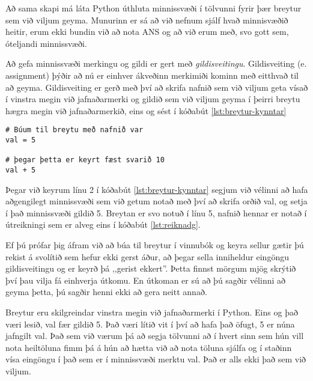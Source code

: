 Að sama skapi má láta Python úthluta minnissvæði í tölvunni fyrir þær breytur sem við viljum geyma.
Munurinn er sá að við nefnum sjálf hvað minnisvæðið heitir, erum ekki bundin við að nota ANS og að við erum með, svo gott sem, óteljandi minnissvæði.

Að gefa minnissvæði merkingu og gildi er gert með \textit{gildisveitingu}.
Gildisveiting (e. assignment) þýðir að nú er einhver ákveðinn merkimiði kominn með eitthvað til að geyma.
Gildisveiting er gerð með því að skrifa nafnið sem við viljum geta vísað í vinstra megin við jafnaðarmerki og gildið sem við viljum geyma í þeirri breytu hægra megin við jafnaðarmerkið, eins og sést í kóðabút \ref{lst:breytur-kynntar}

\begin{lstlisting}[caption=Breytur kynntar, label=lst:breytur-kynntar]
# Búum til breytu með nafnið var
val = 5

# þegar þetta er keyrt fæst svarið 10
val + 5
\end{lstlisting}

Þegar við keyrum línu 2 í kóðabút \ref{lst:breytur-kynntar} segjum við vélinni að hafa aðgengilegt minnissvæði sem við getum notað með því að skrifa orðið val, og setja í það minnissvæði gildið 5.
Breytan er svo notuð í línu 5, nafnið hennar er notað í útreikningi sem er alveg eins í kóðabút \ref{lst:reiknadg}.

Ef þú prófar þig áfram við að búa til breytur í vinnubók og keyra sellur gætir þú rekist á svolítið sem hefur ekki gerst áður, að þegar sella inniheldur eingöngu gildisveitingu og er keyrð þá ,,gerist ekkert''.
Þetta finnst mörgum mjög skrýtið því þau vilja fá einhverja útkomu.
En útkoman er sú að þú sagðir vélinni að geyma þetta, þú sagðir henni ekki að gera neitt annað.

Breytur eru skilgreindar vinstra megin við jafnaðarmerki í Python.
Eins og það væri lesið, val fær gildið 5.
Það væri lítið vit í því að hafa það öfugt, 5 er núna jafngilt val.
Það sem við værum þá að segja tölvunni að í hvert sinn sem hún vill nota heiltöluna fimm þá á hún að hætta við að nota töluna sjálfa og í staðinn vísa eingöngu í það sem er í minnissvæði merktu val.
Það er alls ekki það sem við viljum.


